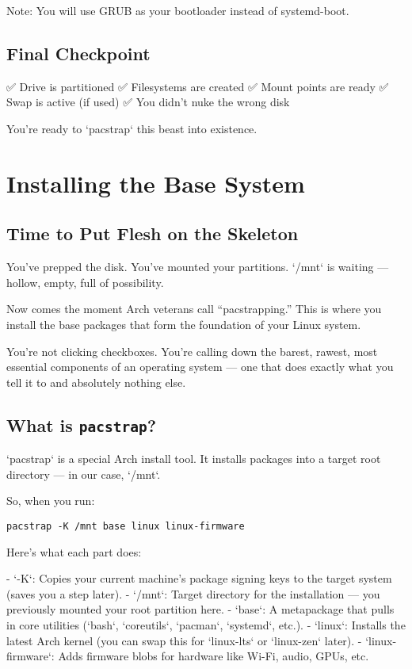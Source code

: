 \documentclass[12pt]{book}
\begin{document}
Note: You will use GRUB as your bootloader instead of systemd-boot.

\section{Final Checkpoint}

✅ Drive is partitioned  
✅ Filesystems are created  
✅ Mount points are ready  
✅ Swap is active (if used)  
✅ You didn’t nuke the wrong disk

You're ready to `pacstrap` this beast into existence.

\clearpage


\chapter{Installing the Base System}

\section*{Time to Put Flesh on the Skeleton}

You’ve prepped the disk. You’ve mounted your partitions. `/mnt` is waiting — hollow, empty, full of possibility.

Now comes the moment Arch veterans call “pacstrapping.” This is where you install the base packages that form the foundation of your Linux system.

You’re not clicking checkboxes. You’re calling down the barest, rawest, most essential components of an operating system — one that does exactly what you tell it to and absolutely nothing else.

\section{What is \texttt{pacstrap}?}

`pacstrap` is a special Arch install tool. It installs packages into a target root directory — in our case, `/mnt`.

So, when you run:

\begin{lstlisting}
pacstrap -K /mnt base linux linux-firmware
\end{lstlisting}

Here’s what each part does:

- `-K`: Copies your current machine’s package signing keys to the target system (saves you a step later).
- `/mnt`: Target directory for the installation — you previously mounted your root partition here.
- `base`: A metapackage that pulls in core utilities (`bash`, `coreutils`, `pacman`, `systemd`, etc.).
- `linux`: Installs the latest Arch kernel (you can swap this for `linux-lts` or `linux-zen` later).
- `linux-firmware`: Adds firmware blobs for hardware like Wi-Fi, audio, GPUs, etc.
\end{document}
